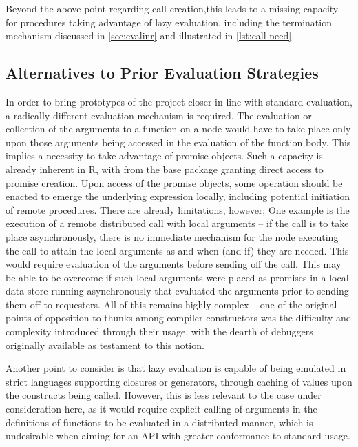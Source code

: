 Beyond the above point regarding call creation,this leads to a missing capacity for procedures taking advantage of lazy evaluation, including the termination mechanism discussed in \cref{sec:evalinr} and illustrated in \cref{lst:call-need}.

\subsection{Alternatives to Prior Evaluation Strategies}

In order to bring prototypes of the project closer in line with standard \R{} evaluation, a radically different evaluation mechanism is required.
The evaluation or collection of the arguments to a function on a node would have to take place only upon those arguments being accessed in the evaluation of the function body.
This implies a necessity to take advantage of promise objects.
Such a capacity is already inherent in R, with  from the base package granting direct access to promise creation.
Upon access of the promise objects, some operation should be enacted to emerge the underlying expression locally, including potential initiation of remote procedures.
There are already limitations, however;
One example is the execution of a remote distributed call with local arguments -- if the call is to take place asynchronously, there is no immediate mechanism for the node executing the call to attain the local arguments as and when (and if) they are needed.
This would require evaluation of the arguments before sending off the call.
This may be able to be overcome if such local arguments were placed as promises in a local data store running asynchronously that evaluated the arguments prior to sending them off to requesters.
All of this remains highly complex -- one of the original points of opposition to thunks \cite{ingerman1961thunks}among compiler constructors was the difficulty and complexity introduced through their usage, with the dearth of debuggers originally available as testament to this notion.

Another point to consider is that lazy evaluation is capable of being emulated in strict languages supporting closures or generators, through caching of values upon the constructs being called.
However, this is less relevant to the case under consideration here, as it would require explicit calling of arguments in the definitions of functions to be evaluated in a distributed manner, which is undesirable when aiming for an API with greater conformance to standard \R{} usage.

